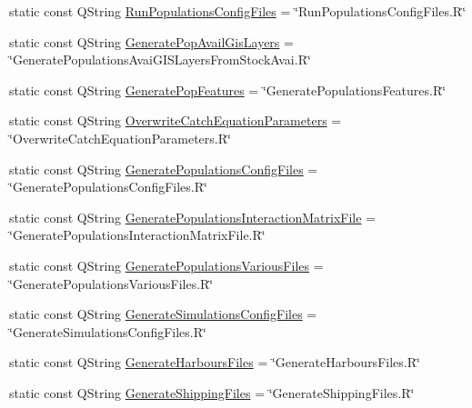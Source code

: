 \begin{DoxyCompactItemize}
\item 
static const Q\+String \mbox{\hyperlink{classdisplace_1_1_r_1_1_settings_1_1_scripts_a3d3d7b8f8bba066373e940396b75692a}{Run\+Populations\+Config\+Files}} = \char`\"{}Run\+Populations\+Config\+Files.\+R\char`\"{}
\item 
static const Q\+String \mbox{\hyperlink{classdisplace_1_1_r_1_1_settings_1_1_scripts_a1bbaa1d6cd67e091977e3b8220dd9774}{Generate\+Pop\+Avail\+Gis\+Layers}} = \char`\"{}Generate\+Populations\+Avai\+G\+I\+S\+Layers\+From\+Stock\+Avai.\+R\char`\"{}
\item 
static const Q\+String \mbox{\hyperlink{classdisplace_1_1_r_1_1_settings_1_1_scripts_a7e04aee9570282d5cde7232983a5ead8}{Generate\+Pop\+Features}} = \char`\"{}Generate\+Populations\+Features.\+R\char`\"{}
\item 
static const Q\+String \mbox{\hyperlink{classdisplace_1_1_r_1_1_settings_1_1_scripts_a201f1b92f8f7bb809675a3e9cab2c0f7}{Overwrite\+Catch\+Equation\+Parameters}} = \char`\"{}Overwrite\+Catch\+Equation\+Parameters.\+R\char`\"{}
\item 
static const Q\+String \mbox{\hyperlink{classdisplace_1_1_r_1_1_settings_1_1_scripts_a10b2f43dc637159d702a8152b8c13d51}{Generate\+Populations\+Config\+Files}} = \char`\"{}Generate\+Populations\+Config\+Files.\+R\char`\"{}
\item 
static const Q\+String \mbox{\hyperlink{classdisplace_1_1_r_1_1_settings_1_1_scripts_acd2e6772d838ae5df1489450076edb9e}{Generate\+Populations\+Interaction\+Matrix\+File}} = \char`\"{}Generate\+Populations\+Interaction\+Matrix\+File.\+R\char`\"{}
\item 
static const Q\+String \mbox{\hyperlink{classdisplace_1_1_r_1_1_settings_1_1_scripts_ad4cf223758c530d74205eb5074db12e1}{Generate\+Populations\+Various\+Files}} = \char`\"{}Generate\+Populations\+Various\+Files.\+R\char`\"{}
\item 
static const Q\+String \mbox{\hyperlink{classdisplace_1_1_r_1_1_settings_1_1_scripts_a6d6d9238ecd3e9eb601efd6251562e0e}{Generate\+Simulations\+Config\+Files}} = \char`\"{}Generate\+Simulations\+Config\+Files.\+R\char`\"{}
\item 
static const Q\+String \mbox{\hyperlink{classdisplace_1_1_r_1_1_settings_1_1_scripts_a5366b3b9be6b214911e774d74e938dff}{Generate\+Harbours\+Files}} = \char`\"{}Generate\+Harbours\+Files.\+R\char`\"{}
\item 
static const Q\+String \mbox{\hyperlink{classdisplace_1_1_r_1_1_settings_1_1_scripts_a4468742e9ab1836ab0ac2bc62cc5d59f}{Generate\+Shipping\+Files}} = \char`\"{}Generate\+Shipping\+Files.\+R\char`\"{}

\end{DoxyCompactItemize}
